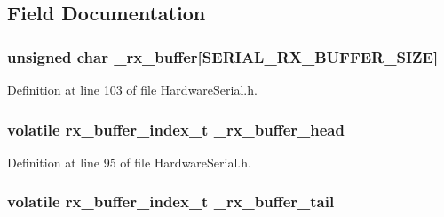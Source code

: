 \subsection{Field Documentation}
\hypertarget{class_hardware_serial_ae33d584001d6c3fbbc6a8097b0ab19c7}{}
\subsubsection[{\+\_\+rx\+\_\+buffer}]{\setlength{\rightskip}{0pt plus 5cm}unsigned char \+\_\+rx\+\_\+buffer\mbox{[}{\bf S\+E\+R\+I\+A\+L\+\_\+\+R\+X\+\_\+\+B\+U\+F\+F\+E\+R\+\_\+\+S\+I\+Z\+E}\mbox{]}\hspace{0.3cm}{\ttfamily [protected]}}\label{class_hardware_serial_ae33d584001d6c3fbbc6a8097b0ab19c7}


Definition at line 103 of file Hardware\+Serial.\+h.

\hypertarget{class_hardware_serial_a797ebcc80bc2806b3ebbfc509e7aeabe}{}
\subsubsection[{\+\_\+rx\+\_\+buffer\+\_\+head}]{\setlength{\rightskip}{0pt plus 5cm}volatile {\bf rx\+\_\+buffer\+\_\+index\+\_\+t} \+\_\+rx\+\_\+buffer\+\_\+head\hspace{0.3cm}{\ttfamily [protected]}}\label{class_hardware_serial_a797ebcc80bc2806b3ebbfc509e7aeabe}


Definition at line 95 of file Hardware\+Serial.\+h.

\hypertarget{class_hardware_serial_a0343d5d99eb23a56dd3ad5b48928a94a}{}
\subsubsection[{\+\_\+rx\+\_\+buffer\+\_\+tail}]{\setlength{\rightskip}{0pt plus 5cm}volatile {\bf rx\+\_\+buffer\+\_\+index\+\_\+t} \+\_\+rx\+\_\+buffer\+\_\+tail\hspace{0.3cm}{\ttfamily [protected]}}\label{class_hardware_serial_a0343d5d99eb23a56dd3ad5b48928a94a}


